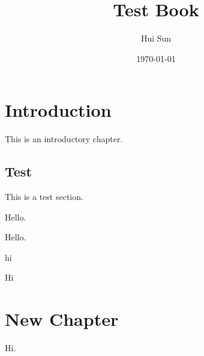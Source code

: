 \documentclass[openany]{book}
\title{Test Book}
\date{\today}
\author{Hui Sun}
\begin{document}
\maketitle

\tableofcontents

\chapter{Introduction}
This is an introductory chapter.

\section{Test}
This is a test section.
\begin{thm}
    Hello.
\end{thm}
\begin{theorem}
    Hello.
\end{theorem}


\begin{prop}
	hi 
\end{prop}

\begin{cor}
	Hi
\end{cor}






\chapter{New Chapter}

\begin{theorem}
	Hi.
\end{theorem}
\end{document}
